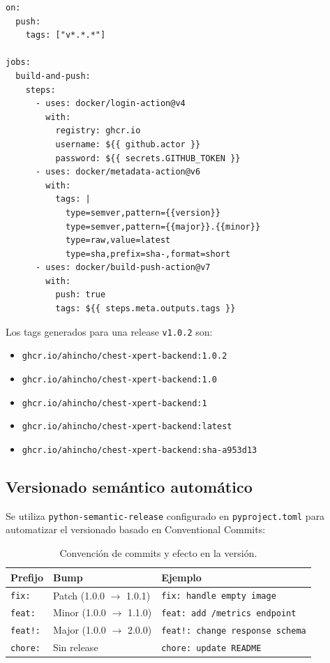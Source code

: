 \begin{lstlisting}[language={}, caption={Fragmento de cd.yml --- Build y push a GHCR.}]
on:
  push:
    tags: ["v*.*.*"]

jobs:
  build-and-push:
    steps:
      - uses: docker/login-action@v4
        with:
          registry: ghcr.io
          username: ${{ github.actor }}
          password: ${{ secrets.GITHUB_TOKEN }}
      - uses: docker/metadata-action@v6
        with:
          tags: |
            type=semver,pattern={{version}}
            type=semver,pattern={{major}}.{{minor}}
            type=raw,value=latest
            type=sha,prefix=sha-,format=short
      - uses: docker/build-push-action@v7
        with:
          push: true
          tags: ${{ steps.meta.outputs.tags }}
\end{lstlisting}

\noindent
Los tags generados para una release \texttt{v1.0.2} son:

\begin{itemize}
    \item \texttt{ghcr.io/ahincho/chest-xpert-backend:1.0.2}
    \item \texttt{ghcr.io/ahincho/chest-xpert-backend:1.0}
    \item \texttt{ghcr.io/ahincho/chest-xpert-backend:1}
    \item \texttt{ghcr.io/ahincho/chest-xpert-backend:latest}
    \item \texttt{ghcr.io/ahincho/chest-xpert-backend:sha-a953d13}
\end{itemize}

\subsection{Versionado sem\'antico autom\'atico}

Se utiliza \texttt{python-semantic-release} \cite{gift2021mlops} configurado en \texttt{pyproject.toml} para automatizar el versionado basado en Conventional Commits:

\begin{table}[H]
\centering
\caption{Convenci\'on de commits y efecto en la versi\'on.}
\small
\begin{tabular}{llp{4.5cm}}
\toprule
\textbf{Prefijo} & \textbf{Bump} & \textbf{Ejemplo} \\
\midrule
\texttt{fix:}   & Patch (1.0.0 $\rightarrow$ 1.0.1) & \texttt{fix: handle empty image} \\
\texttt{feat:}  & Minor (1.0.0 $\rightarrow$ 1.1.0) & \texttt{feat: add /metrics endpoint} \\
\texttt{feat!:} & Major (1.0.0 $\rightarrow$ 2.0.0) & \texttt{feat!: change response schema} \\
\texttt{chore:} & Sin release & \texttt{chore: update README} \\
\bottomrule
\end{tabular}
\end{table}

